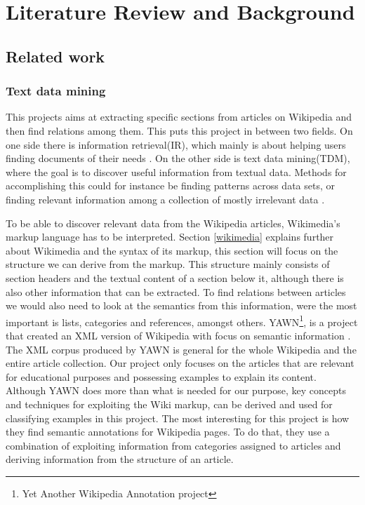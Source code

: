 
\chapter{Literature Review and Background}


\section{Related work}

\subsection{Text data mining} \label{sec_tdm}
This projects aims at extracting specific sections from articles on Wikipedia and then find relations among them. This puts this project in between two fields. On one side there is information retrieval(IR), which mainly is about helping users finding documents of their needs \cite{irbook}. On the other side is text data mining(TDM), where the goal is to discover useful information from textual data. Methods for accomplishing this could for instance be finding patterns across data sets, or finding relevant information among a collection of mostly irrelevant data \cite{untanglingTDM}.

To be able to discover relevant data from the Wikipedia articles, Wikimedia's markup language has to be interpreted. Section \ref{wikimedia} explains further about Wikimedia and the syntax of its markup, this section will focus on the structure we can derive from the markup. This structure mainly consists of section headers and the textual content of a section below it, although there is also other information that can be extracted. To find relations between articles we would also need to look at the semantics from this information, were the most important is lists, categories and references, amongst others. YAWN\footnote{Yet Another Wikipedia Annotation project}, is a project that created an XML version of Wikipedia with focus on semantic information \cite{yawn}. The XML corpus produced by YAWN is general for the whole Wikipedia and the entire article collection. Our project only focuses on the articles that are relevant for educational purposes and possessing examples to explain its content. Although YAWN does more than what is needed for our purpose, key concepts and techniques for exploiting the Wiki markup, can be derived and used for classifying examples in this project. The most interesting for this project is how they find semantic annotations for Wikipedia pages. To do that, they use a combination of exploiting information from categories assigned to articles and deriving information from the structure of an article.

